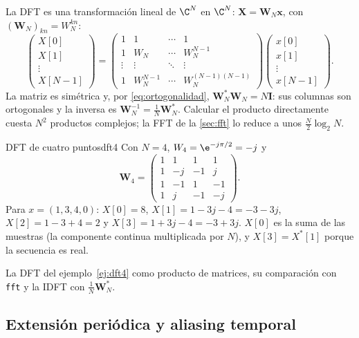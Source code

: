 \documentclass[11pt,a4paper]{scrartcl}
\begin{document}
La DFT es una transformación lineal de $\C^N$ en $\C^N$: $\mathbf X=\mathbf W_N\mathbf x$, con $(\mathbf W_N)_{kn}=W_N^{kn}$:
\[
  \begin{pmatrix}X[0]\\X[1]\\\vdots\\X[N-1]\end{pmatrix}=
  \begin{pmatrix}
    1&1&\cdots&1\\
    1&W_N&\cdots&W_N^{N-1}\\
    \vdots&\vdots&\ddots&\vdots\\
    1&W_N^{N-1}&\cdots&W_N^{(N-1)(N-1)}
  \end{pmatrix}
  \begin{pmatrix}x[0]\\x[1]\\\vdots\\x[N-1]\end{pmatrix}.
\]
La matriz es simétrica y, por \eqref{eq:ortogonalidad}, $\mathbf W_N^*\mathbf W_N=N\mathbf I$: sus columnas son ortogonales y la inversa es $\mathbf W_N^{-1}=\frac1N\mathbf W_N^*$. Calcular el producto directamente cuesta $N^2$ productos complejos; la FFT de la \cref{sec:fft} lo reduce a unos $\frac N2\log_2N$.

\begin{ejemplo}{DFT de cuatro puntos}{dft4}
  Con $N=4$, $W_4=\e^{-j\pi/2}=-j$ y
  \[
    \mathbf W_4=\begin{pmatrix}1&1&1&1\\1&-j&-1&j\\1&-1&1&-1\\1&j&-1&-j\end{pmatrix}.
  \]
  Para $x=(1,3,4,0)$: $X[0]=8$, $X[1]=1-3j-4=-3-3j$, $X[2]=1-3+4=2$ y $X[3]=1+3j-4=-3+3j$. $X[0]$ es la suma de las muestras (la componente continua multiplicada por $N$), y $X[3]=X^*[1]$ porque la secuencia es real.
\end{ejemplo}

\begin{encodigo}
  La DFT del ejemplo~\ref{ej:dft4} como producto de matrices, su comparación con \texttt{fft} y la IDFT con $\frac1N\mathbf W_N^*$.
\end{encodigo}

\subsection{Extensión periódica y aliasing temporal}
\end{document}
